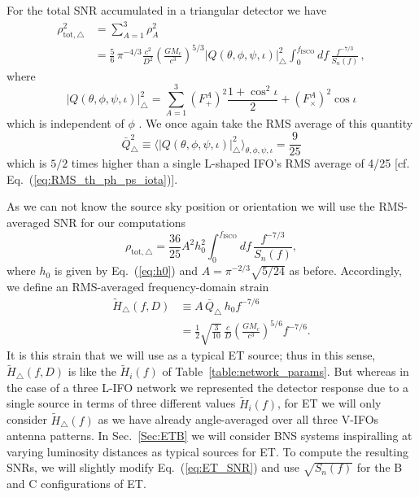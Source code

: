 \documentclass[11pt,a4paper]{article}
\newcommand{\f}{\frac}
\newcommand{\nn}{\nonumber}
\newcommand{\be}{\begin{equation}}
\newcommand{\ee}{\end{equation}}
\begin{document}
For the total SNR accumulated in a triangular detector we have
%
\begin{align}
\rho^2_{\text{tot},\bigtriangleup} & = \sum_{A=1}^3 \rho_A^2 \nn \\
 & =  \f{5}{6}\, \pi^{-4/3} \f{c^2}{D^2}\left(\f{G M_c}{c^3}\right)^{5/3}|Q(\theta,\phi,\psi,\iota)|_\bigtriangleup^2 \int_0^{f_\text{ISCO}} d f\, \f{f^{-7/3}}{S_n(f)} \, ,\label{eq:ET_SNRsq}
\end{align}
where
%
\be
|Q(\theta,\phi,\psi,\iota)|_\bigtriangleup^2 = \sum_{A=1}^3 \left(F^A_+\right)^2\f{1+\cos^2\iota}{2}  + \left(F^A_\times\right)^2 \cos\iota \label{eq:Q_sq_ET}
\ee
%
which is independent of $\phi$ \cite{Regimbau:2012ir}. We once again take the RMS average of this quantity
%
\be
\bar{Q}^2_\bigtriangleup\equiv\langle |Q(\theta,\phi,\psi,\iota)|_\bigtriangleup^2 \rangle_{\theta,\phi,\psi,\iota} = \f{9}{25}\label{eq:RMS_ET}
\ee
%
which is $5/2$ times higher than a single L-shaped IFO's RMS average of 4/25 [cf. Eq.~(\ref{eq:RMS_th_ph_ps_iota})].

As we can not know the source sky position or orientation we will use the RMS-averaged SNR for our computations %
%
\be
\rho_{\text{tot},\bigtriangleup} = \f{36}{25}A^2 h_0^2 \int_0^{f_\text{ISCO}} d f\, \f{f^{-7/3}}{S_n(f)} \label{eq:ET_SNR},
\ee
where $h_0$ is given by Eq.~(\ref{eq:h0}) and $A=\pi^{-2/3}\sqrt{5/24}$ as before. %
Accordingly, we define an RMS-averaged frequency-domain
strain
%
\begin{align}
\tilde{H}_\bigtriangleup(f, D)&\equiv A\,  \bar{Q}_\bigtriangleup\, h_0 f^{-7/6} \nn \\
   & = \f{1}{2}\sqrt{\f{3}{10}}\, \f{c}{D}\left(\f{G M_c}{c^3}\right)^{5/6} f^{-7/6}. \label{eq:H_delta}
\end{align}
%
It is this strain that we will use as a typical ET source; thus in this sense,
$\tilde{H}_\bigtriangleup(f,D)$ is like the $\tilde{H}_i(f)$ of Table~\ref{table:network_params}.
But whereas in the case of a three L-IFO network we represented the detector response due to a single source in terms of three different
values $\tilde{H}_i(f)$, for ET we will only consider $\tilde{H}_\bigtriangleup(f)$ as we have already angle-averaged over all three V-IFOs antenna patterns.
In Sec.~\ref{Sec:ETB} we will consider BNS systems inspiralling at varying luminosity distances as typical sources for ET.
To compute the resulting SNRs, we will slightly modify Eq.~(\ref{eq:ET_SNR}) and use $\sqrt{S_n(f)}$ for the B and C configurations of ET.
\end{document}
